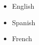 %
%
%

{
\vspace{1em}
\begin{itemize}
	\item English
	\item Spanish               
    \item French
\end{itemize}}
